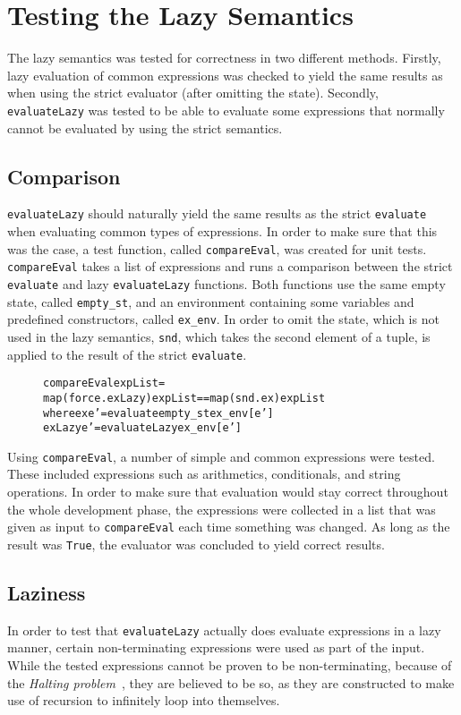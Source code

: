 \section{Testing the Lazy Semantics}
\label{LazySemTest}
The lazy semantics was tested for correctness in two different methods.
Firstly, lazy evaluation of common
expressions was checked to yield the same results as when using the strict
evaluator (after omitting the state). Secondly, \texttt{evaluateLazy}
was tested to be able to evaluate some expressions that normally cannot be
evaluated by using the strict semantics.

\subsection{Comparison}
\texttt{evaluateLazy} should naturally yield the same results as the strict
\texttt{evaluate} when evaluating common types of expressions. In order to
make sure that this was the case, a test
function, called \texttt{compareEval}, was created for unit tests.
\texttt{compareEval} takes a list of expressions and runs a comparison between
the strict \texttt{evaluate} and lazy \texttt{evaluateLazy} functions.
Both functions use the same empty state, called \texttt{empty\_st}, and
an environment containing some variables and predefined constructors,
called \texttt{ex\_env}. In order to omit the state, which is not used in
the lazy semantics, \texttt{snd}, which takes the second element of a tuple,
is applied to the result of the strict \texttt{evaluate}.

\begin{figure}[!ht]
\begin{alltt}
  compareEval expList =
    map (force . exLazy) expList == map (snd . ex) expList
      where ex     e' = evaluate empty_st ex_env [e']
            exLazy e' = evaluateLazy ex_env [e']
\end{alltt}
\end{figure}

Using \texttt{compareEval}, a number of simple and common expressions were
tested. These included expressions such as arithmetics, conditionals, and
string operations. In order to make sure that evaluation would stay correct
throughout the whole development phase, the expressions were collected in a
list that was given as input to \texttt{compareEval} each time something was
changed. As long as the result was \texttt{True}, the evaluator was concluded
to yield correct results.

\subsection{Laziness}
\label{lazinessSem}
In order to test that \texttt{evaluateLazy} actually does evaluate expressions
in a lazy manner, certain non-terminating expressions were used as part of the
input. While the tested expressions cannot be proven to be non-terminating,
because of the \textit{Halting problem}~\cite{haltingproblem}, they are believed
to be so, as they are constructed to make use of recursion to infinitely loop
into themselves.

